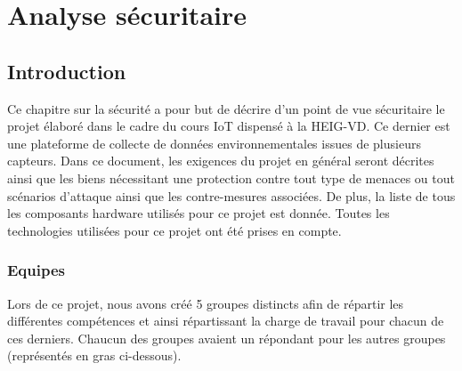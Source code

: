 \chapter{Analyse sécuritaire}

\section{Introduction}
Ce chapitre sur la sécurité a pour but de décrire d'un point de vue sécuritaire le projet élaboré dans le cadre du cours IoT dispensé à la HEIG-VD. Ce dernier est une plateforme de collecte de données environnementales issues de plusieurs capteurs. Dans ce document, les exigences du projet en général seront décrites ainsi que les biens nécessitant une protection contre tout type de menaces ou tout scénarios d'attaque ainsi que les contre-mesures associées. De plus, la liste de tous les composants hardware utilisés pour ce projet est donnée. Toutes les technologies utilisées pour ce projet ont été prises en compte.

\subsection{Equipes}
Lors de ce projet, nous avons créé 5 groupes distincts afin de répartir les différentes compétences et ainsi répartissant la charge de travail pour chacun de ces derniers. Chaucun des groupes avaient un répondant pour les autres groupes (représentés en gras ci-dessous).

